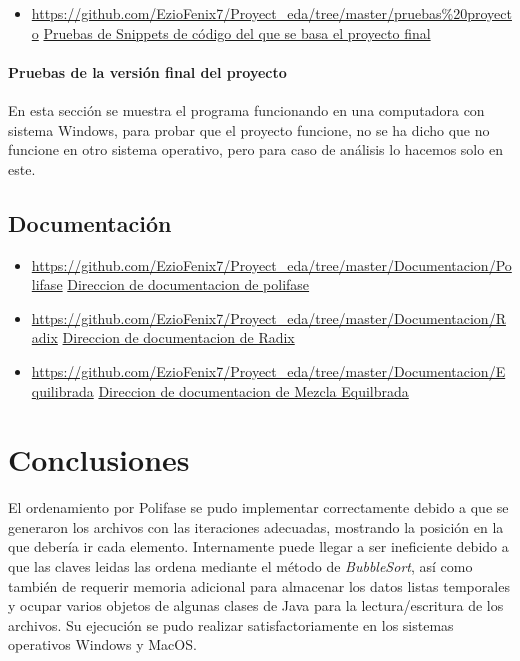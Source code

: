 \documentclass{article}
\begin{document}
			\begin{itemize}
				\item \url{https://github.com/EzioFenix7/Proyect_eda/tree/master/pruebas\%20proyecto}
				\href{https://github.com/EzioFenix7/Proyect_eda/tree/master/pruebas\%20proyecto}{ Pruebas de Snippets de código del que se basa el proyecto final}
			\end{itemize}
		
		\paragraph*{Pruebas de la versión final del proyecto}
		En esta sección se muestra el programa funcionando en una computadora con sistema Windows, para probar que el proyecto funcione, no se ha dicho que no funcione en otro sistema operativo, pero para caso de análisis lo hacemos solo en este.
		
	\subsection{Documentación}
		\begin{itemize}
			\item \url{https://github.com/EzioFenix7/Proyect_eda/tree/master/Documentacion/Polifase}
			\href{https://github.com/EzioFenix7/Proyect_eda/tree/master/Documentacion/Polifase}{Direccion de documentacion de polifase}
			
			\item \url{https://github.com/EzioFenix7/Proyect_eda/tree/master/Documentacion/Radix}
			\href{https://github.com/EzioFenix7/Proyect_eda/tree/master/Documentacion/Radix}{Direccion de documentacion de Radix}
			
			\item 	\url{https://github.com/EzioFenix7/Proyect_eda/tree/master/Documentacion/Equilibrada}
			\href{https://github.com/EzioFenix7/Proyect_eda/tree/master/Documentacion/Equilibrada}{Direccion de documentacion de Mezcla Equilbrada}
		\end{itemize}

	\section{Conclusiones}
	El ordenamiento por Polifase se pudo implementar correctamente debido a que se generaron los archivos con las iteraciones adecuadas, mostrando la posición en la que debería ir cada elemento.
	Internamente puede llegar a ser ineficiente debido a que las claves leidas las ordena mediante el método de \textit{BubbleSort}, así como también de requerir memoria adicional para almacenar
	los datos listas temporales y ocupar varios objetos de algunas clases de Java para la lectura/escritura de los archivos. Su ejecución se pudo realizar satisfactoriamente en los sistemas operativos
	Windows y MacOS.\\
	
\end{document}
